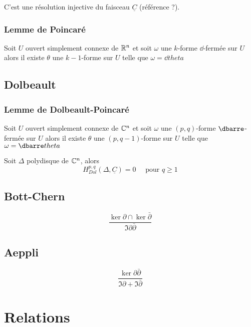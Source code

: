 C'est une résolution injective du faisceau $\underline{C}$ (référence ?).

\subsection{Lemme de Poincaré}
\begin{lem}[Poincaré]
Soit $U$ ouvert simplement connexe de $\mathbb{R}^n$ et soit $\omega$ une $k$-forme $\dd$-fermée sur $U$ alors il existe $\theta$ une $k-1$-forme sur $U$ telle que $\omega = \dd theta$
\end{lem}



\section{Dolbeault}

\subsection{Lemme de Dolbeault-Poincaré}
\begin{lem}[]
Soit $U$ ouvert simplement connexe de $\mathbb{C}^n$ et soit $\omega$ une $(p,q)$-forme $\dbarre$-fermée sur $U$ alors il existe $\theta$ une $(p,q-1)$-forme sur $U$ telle que $\omega = \dbarre theta$
\end{lem}

\begin{lem}
Soit $\Delta$ polydisque de $\mathbb{C}^n$, alors
\begin{equation}
H^{p,q}_{Dol}(\Delta,\underline{C}) = 0 \quad \text{ pour } q \geq 1
\end{equation}
\end{lem}

\section{Bott-Chern}
\[
\dfrac{\ker \partial \cap \ker \bar\partial}{\Im \partial\bar\partial}
\]

\section{Aeppli}
\[
\dfrac{\ker \partial\bar\partial}{\Im \partial + \Im\bar\partial}
\]

\chapter{Relations}

